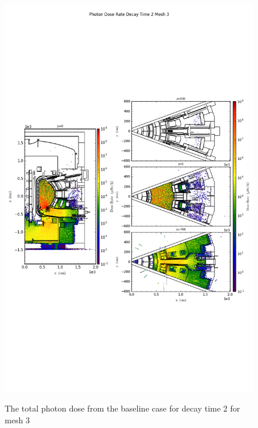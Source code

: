 \begin{figure}[ht!]
\centering
\includegraphics[trim={0cm 9cm 0cm 10cm},clip,scale=0.75]{../plots/final_model_nob4c/Photon_Dose_Rate_Decay_Time_2_Mesh_3.png}
\label{fig:photons_dc2_no4bc_m3_flux}
\caption{The total photon dose from the baseline case for decay time 2 for mesh 3}
\end{figure}
